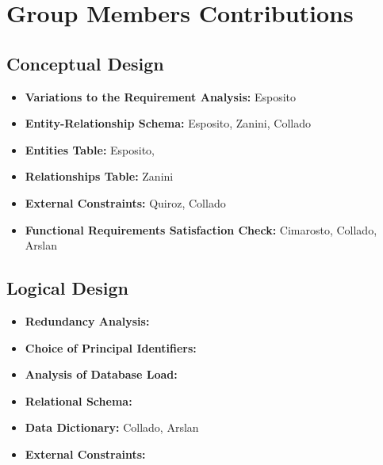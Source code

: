 \section{Group Members Contributions}


\subsection{Conceptual Design}
\begin{itemize}
	\item \textbf{Variations to the Requirement Analysis:} Esposito
	\item \textbf{Entity-Relationship Schema:} Esposito, Zanini, Collado 
	\item \textbf{Entities Table:} Esposito, 
	\item \textbf{Relationships Table:} Zanini
	\item \textbf{External Constraints:} Quiroz, Collado
	\item \textbf{Functional Requirements Satisfaction Check:} Cimarosto, Collado, Arslan
\end{itemize}

\subsection{Logical Design}
\begin{itemize}
	\item \textbf{Redundancy Analysis:} 
	\item \textbf{Choice of Principal Identifiers:}
	\item \textbf{Analysis of Database Load:}
	\item \textbf{Relational Schema:}
	\item \textbf{Data Dictionary:} Collado, Arslan
	\item \textbf{External Constraints:}
\end{itemize}	